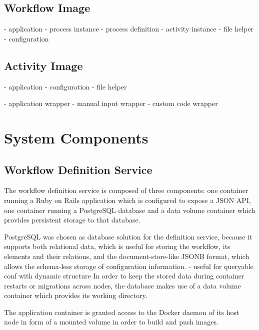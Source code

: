   \subsection{Workflow Image} %
  \label{sub:workflow_container}
    - application
      - process instance
      - process definition
      - activity instance
      - file helper
      - configuration


  \subsection{Activity Image} %
  \label{sub:activity_containers}
    - application
      - configuration
      - file helper

    - application wrapper
    - manual input wrapper
    - custom code wrapper

\section{System Components} %
\label{sec:components_implementation}
  \subsection{Workflow Definition Service} %
    \label{sub:workflow_definition_service}

    The workflow definition service is composed of three components: one container running a Ruby on Rails application which is configured to expose a JSON API, one container running a PostgreSQL database and a data volume container which provides persistent storage to that database.

    PostgreSQL was chosen as database solution for the definition service, because it supports both relational data, which is useful for storing the workflow, its elements and their relations, and the document-store-like JSONB format, which allows the schema-less storage of configuration information.
    - useful for queryable conf with dynamic structure
    In order to keep the stored data during container restarts or migrations across nodes, the database makes use of a data volume container which provides its working directory.

    The application container is granted access to the Docker daemon of its host node in form of a mounted volume in order to build and push images.

